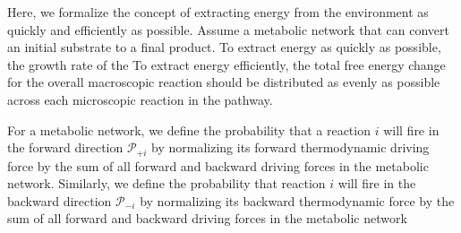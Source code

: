 Here, we formalize the concept of extracting energy from the environment as quickly and efficiently as possible. Assume a metabolic network that can convert an initial substrate to a final product. To extract energy as quickly as possible, the growth rate of the   To extract energy efficiently, the total free energy change for the overall macroscopic reaction should be distributed as evenly as possible across each microscopic reaction in the pathway.


For a metabolic network, we define the probability that a reaction $i$ will fire in the forward  direction ${\mathcal P_{+i}}$ by normalizing its forward thermodynamic driving force by the sum of all forward and backward driving forces in the metabolic network. Similarly, we define the probability that reaction $i$ will fire in the backward direction $\mathcal P_{-i}$ by normalizing its backward thermodynamic force by  the sum of all forward and backward driving forces in the metabolic network